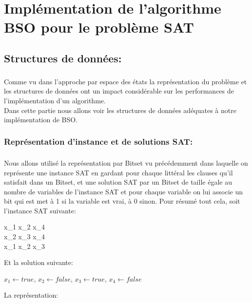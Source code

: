 \chapter{Implémentation de l'algorithme BSO pour le problème SAT}
	\section{Structures de données:}
	\paragraph{}
	Comme vu dans l’approche par espace des états la représentation du problème et les structures de données ont un impact considérable sur les performances de l’implémentation d’un algorithme.\\
	Dans cette partie nous allons voir les structures de données adéquates à notre implémentation de BSO.
	\subsection{Représentation d’instance et de solutions SAT:}
	\paragraph{}
	Nous allons utilisé la représentation par Bitset vu précédemment dans laquelle on représente une instance SAT en gardant pour chaque littéral les clauses qu’il satisfait dans un Bitset, et une solution SAT par un Bitset de taille égale au nombre de variables de l’instance SAT et pour chaque variable on lui associe un bit qui est met à 1 si la variable est vrai, à 0 sinon.
	Pour résumé tout cela, soit l’instance SAT suivante:
	\begin{flalign*}
	x_{1} \lor \neg x_{2} \lor x_{4} \\
	\neg x_{2} \lor x_{3} \lor x_{4} \\
	\neg x_{1} \lor x_{2} \lor \neg x_{3}
	\end{flalign*}
	Et la solution suivante:\\
	\begin{center}
		$x_{1} \leftarrow true$, $x_{2} \leftarrow false$, $x_{3} \leftarrow true$, $x_{4} \leftarrow false $
	\end{center}
	
	La représentation:\\
	
